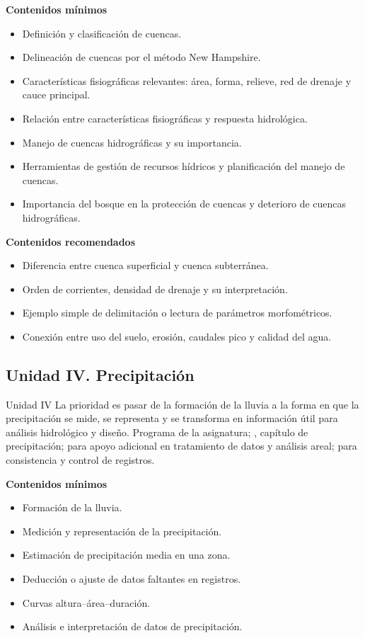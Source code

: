 \documentclass[11pt]{article}
\begin{document}
\textbf{Contenidos mínimos}
\begin{itemize}
\item Definición y clasificación de cuencas.
\item Delineación de cuencas por el método New Hampshire.
\item Características fisiográficas relevantes: área, forma, relieve, red de drenaje y cauce principal.
\item Relación entre características fisiográficas y respuesta hidrológica.
\item Manejo de cuencas hidrográficas y su importancia.
\item Herramientas de gestión de recursos hídricos y planificación del manejo de cuencas.
\item Importancia del bosque en la protección de cuencas y deterioro de cuencas hidrográficas.
\end{itemize}

\textbf{Contenidos recomendados}
\begin{itemize}
\item Diferencia entre cuenca superficial y cuenca subterránea.
\item Orden de corrientes, densidad de drenaje y su interpretación.
\item Ejemplo simple de delimitación o lectura de parámetros morfométricos.
\item Conexión entre uso del suelo, erosión, caudales pico y calidad del agua.
\end{itemize}

\subsection{Unidad IV. Precipitación}
\unitbox
{Unidad IV}
{La prioridad es pasar de la formación de la lluvia a la forma en que la precipitación se mide, se representa y se transforma en información útil para análisis hidrológico y diseño.}
{Programa de la asignatura; \textcite{aparicio1989}, capítulo de precipitación; \textcite{chow1994} para apoyo adicional en tratamiento de datos y análisis areal; \textcite{montealegre1990} para consistencia y control de registros.}

\textbf{Contenidos mínimos}
\begin{itemize}
\item Formación de la lluvia.
\item Medición y representación de la precipitación.
\item Estimación de precipitación media en una zona.
\item Deducción o ajuste de datos faltantes en registros.
\item Curvas altura--área--duración.
\item Análisis e interpretación de datos de precipitación.
\end{itemize}
\end{document}
